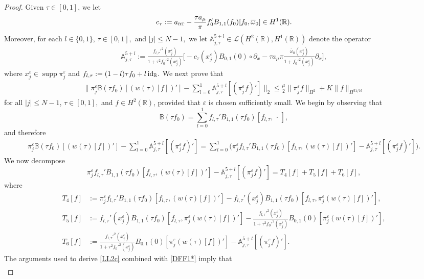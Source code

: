 \documentclass[11pt,reqno]{amsart}
\numberwithin{equation}{section}
\newcommand{\0}{\Omega}
\newcommand{\e}{\varepsilon}
\newcommand{\p}{\partial}
\newcommand{\ov}{\overline}
\newcommand{\oo}{\ov\omega}
\newcommand{\bA}{\mathbb{A}}
\newcommand{\bB}{\mathbb{B}}
\newcommand{\kL}{\mathcal{L}}
\newcommand{\R}{\mathbb{R}}
\DeclareMathOperator{\supp}{supp}
\numberwithin{equation}{section}
\begin{document}
\begin{proof}
 


  Given $\tau\in[0,1]$, we let
\begin{align*} 
 c_\tau:=a_{\text{\tiny RT}}-\frac{\tau a_\mu}{\pi}f_0'B_{1,1}(f_0)[f_0,\oo_0]\in H^1(\R).
\end{align*}
Moreover, for each  $l\in\{0,1\}$, $\tau\in[0,1],$ and $|j|\leq N-1,$ we let  $ \bA_{j,\tau}^{5+l}\in\kL(H^2(\R), H^1(\R))$ denote  the operator  
\begin{align*} 
 \bA_{j,\tau}^{5+l}:=\frac{ f_{l,\tau}'^2(x_j^\e)}{1+\tau^2f_0'^2(x_j^\e)}\Big[ - c_\tau(x_j^\e) B_{0,1}(0)\circ\p_x- \tau a_\mu\pi\frac{\oo_0(x_j^\e)}{ 1+ f_0'^2(x_j^\e) } \p_x\Big],
\end{align*}
where $x_j^\e\in \supp \pi_j^\e$ and $f_{l,\tau} :=(1-l)\tau f_0+l\, {\rm id}_\R. $
 We next prove  that
\begin{align}\label{T4T}
 \Big\|\pi_j^\e \bB(\tau f_0)[(w(\tau)[f])']-\sum_{l=0}^1\bA_{j,\tau}^{5+l}[(\pi^\e_j f)']\Big\|_{2}\leq \frac{\mu}{2} \|\pi_j^\e f\|_{H^2}+K\|  f\|_{H^{31/16}}
\end{align}
 for all $ |j|\leq N-1$, $\tau\in[0,1],$ and  $f\in H^2(\R)$, provided that $\e$ is chosen sufficiently small.
 We begin by observing that
 \[
  \bB(\tau f_0)=\sum_{l=0}^1f_{l,\tau}'B_{1,1}(\tau f_0)[f_{l,\tau},\,\cdot\,],
 \]
and therefore
 \begin{align*}
  \pi_j^\e \bB(\tau f_0)[(w(\tau)[f])']-\sum_{l=0}^1\bA_{j,\tau}^{5+l}[(\pi^\e_j f)']=\sum_{l=0}^1\Big(\pi_j^\e f_{l,\tau}'B_{1,1}(\tau f_0)[f_{l,\tau}, (w(\tau)[f])']-\bA_{j,\tau}^{5+l}[(\pi^\e_j f)']\Big).
 \end{align*}
We now decompose
\[\pi_j^\e f_{l,\tau}'B_{1,1}(\tau f_0)[f_{l,\tau}, (w(\tau)[f])']-\bA_{j,\tau}^{5+l}[(\pi^\e_j f)']=T_{4}[f]+T_{5}[f]+T_{6}[f],\]
where
\begin{align*}
 T_{4}[f]&:=   \pi_j^\e f_{l,\tau}'B_{1,1}(\tau f_0)[f_{l,\tau}, (w(\tau)[f])']-   f_{l,\tau}' (x_j^\e)B_{1,1}(\tau f_0)[f_{l,\tau},\pi_j^\e (w(\tau)[f])'],\\[1ex]
 T_{5}[f]&:=  f_{l,\tau}' (x_j^\e)B_{1,1}(\tau f_0)[f_{l,\tau},\pi_j^\e (w(\tau)[f])']-  \frac{f_{l,\tau}'^2(x_j^\e)}{1+\tau^2f_0'^2(x_j^\e)}  B_{0,1}(0)[ \pi_j^\e (w(\tau)[f])'],\\[1ex]
 T_{6}[f]&:=  \frac{f_{l,\tau}'^2(x_j^\e)}{1+\tau^2f_0'^2(x_j^\e)}  B_{0,1}(0)[ \pi_j^\e (w(\tau)[f])']- \bA_{j,\tau}^{5+l}[(\pi_j^\e f)'].
\end{align*}
The arguments used to derive  \eqref{LL2c}  combined with \eqref{DFF1*} imply that
\begin{align}\label{ca41a}

\end{align}
\end{proof}
\end{document}
